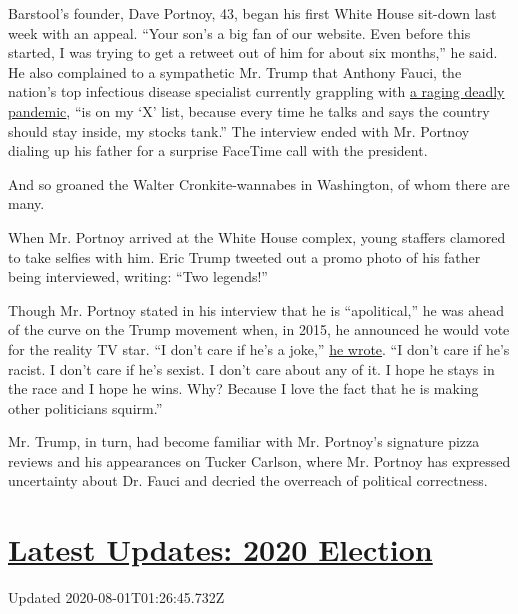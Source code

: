 Barstool's founder, Dave Portnoy, 43, began his first White House
sit-down last week with an appeal. ``Your son's a big fan of our
website. Even before this started, I was trying to get a retweet out of
him for about six months,'' he said. He also complained to a sympathetic
Mr. Trump that Anthony Fauci, the nation's top infectious disease
specialist currently grappling with
\href{https://www.nytimes.com/interactive/2020/us/coronavirus-us-cases.html}{a
raging deadly pandemic}, ``is on my `X' list, because every time he
talks and says the country should stay inside, my stocks tank.'' The
interview ended with Mr. Portnoy dialing up his father for a surprise
FaceTime call with the president.

And so groaned the Walter Cronkite-wannabes in Washington, of whom there
are many.

When Mr. Portnoy arrived at the White House complex, young staffers
clamored to take selfies with him. Eric Trump tweeted out a promo photo
of his father being interviewed, writing: ``Two legends!''

Though Mr. Portnoy stated in his interview that he is ``apolitical,'' he
was ahead of the curve on the Trump movement when, in 2015, he announced
he would vote for the reality TV star. ``I don't care if he's a joke,''
\href{https://www.barstoolsports.com/blog/351804/im-officially-voting-for-donald-trump}{he
wrote}. ``I don't care if he's racist. I don't care if he's sexist. I
don't care about any of it. I hope he stays in the race and I hope he
wins. Why? Because I love the fact that he is making other politicians
squirm.''

Mr. Trump, in turn, had become familiar with Mr. Portnoy's signature
pizza reviews and his appearances on Tucker Carlson, where Mr. Portnoy
has expressed uncertainty about Dr. Fauci and decried the overreach of
political correctness.

\hypertarget{latest-updates-2020-election}{%
\section{\texorpdfstring{\href{https://www.nytimes.com/2020/07/31/us/elections/biden-vs-trump.html?action=click\&pgtype=Article\&state=default\&region=MAIN_CONTENT_1\&context=storylines_live_updates}{Latest
Updates: 2020
Election}}{Latest Updates: 2020 Election}}\label{latest-updates-2020-election}}

Updated 2020-08-01T01:26:45.732Z

